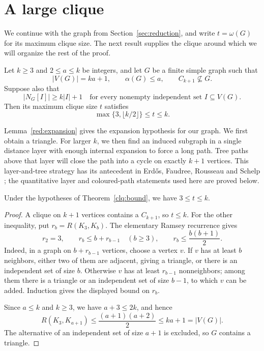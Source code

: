 \section{A large clique}\label{sec:clique}

We continue with the graph from Section~\ref{sec:reduction}, and write
\(t=\omega(G)\) for its maximum clique size.  The next result supplies the
clique around which we will organize the rest of the proof.

\begin{theorem}\label{clq:bound}
Let \(k\ge3\) and \(2\le a\le k\) be integers, and let \(G\) be a finite
simple graph such that
\[
 |V(G)|=ka+1,\qquad \alpha(G)\le a,\qquad C_{k+1}\not\subseteq G.
\]
Suppose also that
\[
 |N_G[I]|\ge k|I|+1
 \quad\text{for every nonempty independent set }I\subseteq V(G).
\]
Then its maximum clique size \(t\) satisfies
\begin{equation}\label{clq:bound-equation}
 \max\{3,\lfloor k/2\rfloor\}\le t\le k.
\end{equation}
\end{theorem}

Lemma~\ref{red:expansion} gives the expansion hypothesis for our graph.
We first obtain a triangle.  For larger \(k\), we then find an induced
subgraph in a single distance layer with enough internal expansion to
force a long path.  Tree paths above that layer will close the path into
a cycle on exactly \(k+1\) vertices. This layer-and-tree strategy has its
antecedent in Erd\H{o}s, Faudree, Rousseau and Schelp
\cite[Section~3]{ErdosFaudreeRousseauSchelp1978}; the quantitative layer
and coloured-path statements used here are proved below.

\begin{lemma}\label{clq:triangle}
Under the hypotheses of Theorem~\ref{clq:bound}, we have \(3\le t\le k\).
\end{lemma}

\begin{proof}
A clique on \(k+1\) vertices contains a \(C_{k+1}\), so \(t\le k\).
For the other inequality, put \(r_b=R(K_3,K_b)\).  The elementary
Ramsey recurrence gives
\[
 r_2=3,\qquad r_b\le b+r_{b-1}\quad(b\ge3),
 \qquad r_b\le\frac{b(b+1)}2.
\]
Indeed, in a graph on \(b+r_{b-1}\) vertices, choose a vertex \(v\).
If \(v\) has at least \(b\) neighbors, either two of them are adjacent,
giving a triangle, or there is an independent set of size \(b\).
Otherwise \(v\) has at least \(r_{b-1}\) nonneighbors; among them there
is a triangle or an independent set of size \(b-1\), to which \(v\)
can be added.  Induction gives the displayed bound on \(r_b\).

Since \(a\le k\) and \(k\ge3\), we have \(a+3\le2k\), and hence
\[
 R(K_3,K_{a+1})\le\frac{(a+1)(a+2)}2\le ka+1=|V(G)|.
\]
The alternative of an independent set of size \(a+1\) is excluded,
so \(G\) contains a triangle.
\end{proof}

